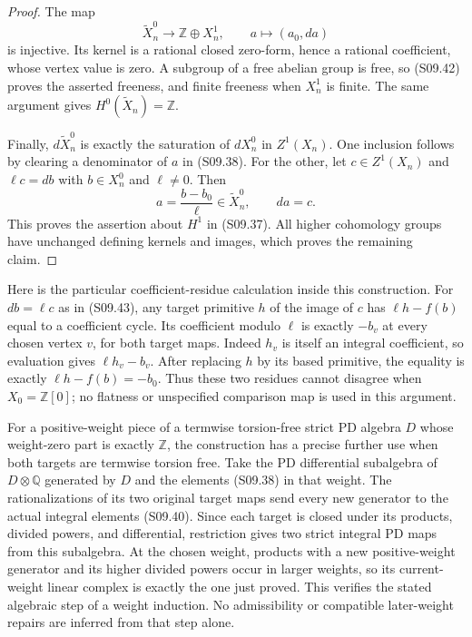 \begin{proof}
The map
\[
       \widetilde X_n^0\longrightarrow
               \mathbb Z\oplus X_n^1,
                   \qquad a\longmapsto(a_0,da)
 \tag{S09.42}
\]
is injective.  Its kernel is a rational closed
zero-form, hence a rational coefficient, whose
vertex value is zero.  A subgroup of a free abelian
group is free, so (S09.42) proves the asserted
freeness, and finite freeness when $X_n^1$ is finite.
The same argument gives $H^0(\widetilde X_n)=\mathbb Z$.

Finally, $d\widetilde X_n^0$ is exactly the saturation
of $dX_n^0$ in $Z^1(X_n)$.  One inclusion follows
by clearing a denominator of $a$ in (S09.38).
For the other, let $c\in Z^1(X_n)$ and
$\ell c=db$ with $b\in X_n^0$ and $\ell\ne0$.
Then
\[
                 a=\frac{b-b_0}{\ell}
                       \in\widetilde X_n^0,
                 \qquad da=c.                       \tag{S09.43}
\]
This proves the assertion about $H^1$ in (S09.37).
All higher cohomology groups have unchanged defining
kernels and images, which proves the remaining claim.
\end{proof}

Here is the particular coefficient-residue calculation
inside this construction.  For $db=\ell c$ as in
(S09.43), any target primitive $h$ of the image of
$c$ has $\ell h-f(b)$ equal to a coefficient cycle.
Its coefficient modulo $\ell$ is exactly $-b_v$
at every chosen vertex $v$, for both target maps.
Indeed $h_v$ is itself an integral coefficient, so
evaluation gives $\ell h_v-b_v$.  After replacing
$h$ by its based primitive, the equality is exactly
$\ell h-f(b)=-b_0$.  Thus these two residues cannot
disagree when $X_0=\mathbb Z[0]$; no flatness or
unspecified comparison map is used in this argument.

For a positive-weight piece of a termwise torsion-free
strict PD algebra $D$ whose weight-zero part is exactly
$\mathbb Z$, the construction has a precise further use
when both targets are termwise torsion free.
Take the PD differential subalgebra of $D\otimes\mathbb Q$
generated by $D$ and the elements (S09.38) in that
weight.  The rationalizations of its two original
target maps send every new generator to the actual
integral elements (S09.40).  Since each target is
closed under its products, divided powers, and
differential, restriction gives two strict integral
PD maps from this subalgebra.  At the chosen weight,
products with a new positive-weight generator and
its higher divided powers occur in larger weights,
so its current-weight linear complex is exactly
the one just proved.  This verifies the stated
algebraic step of a weight induction.  No admissibility
or compatible later-weight repairs are inferred
from that step alone.
